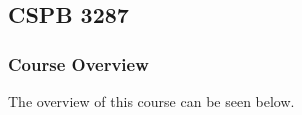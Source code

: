 \clearpage

\renewcommand{\ChapTitle}{\CSPBDataBase}
\renewcommand{\SectionTitle}{CSPB 3287}

\chapter{\ChapTitle}
\section{\SectionTitle}

\subsection{Course Overview}

The overview of this course can be seen below.

